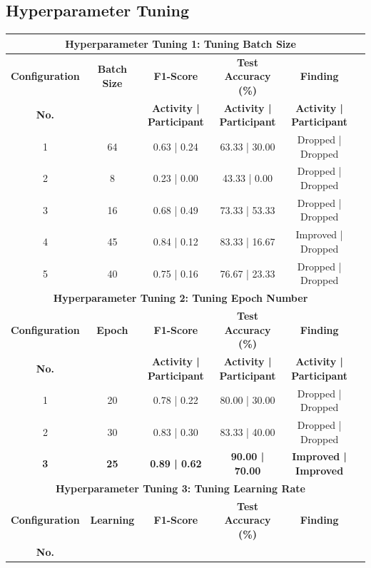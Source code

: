 \documentclass{l4proj}
\begin{document}
\begin{appendices}
\newpage

\subsection{Hyperparameter Tuning}
\begin{table}[h]
    \centering
    \begin{tabular}{cccccc}
        \multicolumn{5}{c}{\textbf{Hyperparameter Tuning 1: Tuning Batch Size}} \\
        \toprule
        \textbf{Configuration} & \textbf{Batch Size} & \textbf{F1-Score} & \textbf{Test Accuracy (\%)} & \textbf{Finding} \\ \textbf{No.}
        & & \textbf{Activity | Participant} & \textbf{Activity | Participant} & \textbf{Activity | Participant}\\
        \midrule
        1 & 64 & 0.63 | 0.24 & 63.33 | 30.00 & Dropped | Dropped\\
        2 & 8 & 0.23 | 0.00 & 43.33 | 0.00 & Dropped | Dropped\\
        3 & 16 & 0.68 | 0.49 & 73.33 | 53.33 & Dropped | Dropped\\
        4 & 45 & 0.84 | 0.12 & 83.33 | 16.67 & Improved | Dropped\\
        5 & 40 & 0.75 | 0.16 & 76.67 | 23.33 & Dropped | Dropped \\
        \midrule
        \multicolumn{5}{c}{\textbf{Hyperparameter Tuning 2: Tuning Epoch Number}} \\
        \midrule
        \textbf{Configuration} & \textbf{Epoch} & \textbf{F1-Score} & \textbf{Test Accuracy (\%)} & \textbf{Finding} \\ \textbf{No.}
        & & \textbf{Activity | Participant} & \textbf{Activity | Participant} & \textbf{Activity | Participant}\\
        \midrule
        1 & 20 & 0.78 | 0.22 & 80.00 | 30.00 & Dropped | Dropped \\
        2 & 30 & 0.83 | 0.30 & 83.33 | 40.00 & Dropped | Dropped \\
        \textbf{3} & \textbf{25} & \textbf{0.89 | 0.62} &\textbf{ 90.00 | 70.00} & \textbf{Improved | Improved}\\
        \midrule
        \multicolumn{5}{c}{\textbf{Hyperparameter Tuning 3: Tuning Learning Rate}} \\
        \midrule
        \textbf{Configuration} & \textbf{Learning} & \textbf{F1-Score} & \textbf{Test Accuracy (\%)} & \textbf{Finding} \\ \textbf{No.}

\end{tabular}
\end{table}
\end{appendices}
\end{document}
